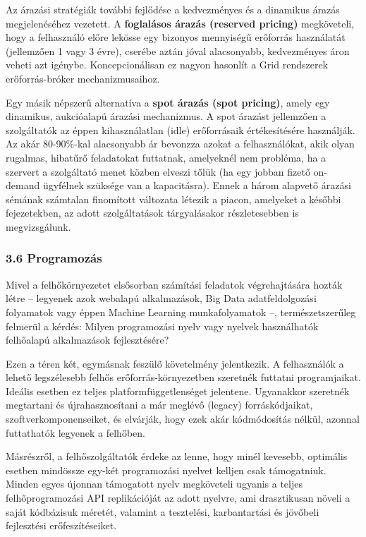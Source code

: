 \documentclass[
]{article}
\begin{document}
Az árazási stratégiák további fejlődése a kedvezményes és a dinamikus
árazás megjelenéséhez vezetett. A \textbf{foglalásos árazás (reserved
pricing)} megköveteli, hogy a felhasználó előre lekösse egy bizonyos
mennyiségű erőforrás használatát (jellemzően 1 vagy 3 évre), cserébe
aztán jóval alacsonyabb, kedvezményes áron veheti azt igénybe.
Koncepcionálisan ez nagyon hasonlít a Grid rendszerek erőforrás-bróker
mechanizmusaihoz.

Egy másik népszerű alternatíva a \textbf{spot árazás (spot pricing)},
amely egy dinamikus, aukcióalapú árazási mechanizmus. A spot árazást
jellemzően a szolgáltatók az éppen kihasználatlan (idle) erőforrásaik
értékesítésére használják. Az akár 80-90\%-kal alacsonyabb ár bevonzza
azokat a felhasználókat, akik olyan rugalmas, hibatűrő feladatokat
futtatnak, amelyeknél nem probléma, ha a szervert a szolgáltató menet
közben elveszi tőlük (ha egy jobban fizető on-demand ügyfélnek szüksége
van a kapacitásra). Ennek a három alapvető árazási sémának számtalan
finomított változata létezik a piacon, amelyeket a későbbi fejezetekben,
az adott szolgáltatások tárgyalásakor részletesebben is megvizsgálunk.

\hypertarget{programozuxe1s}{%
\subsubsection{3.6 Programozás}\label{programozuxe1s}}

Mivel a felhőkörnyezetet elsősorban számítási feladatok végrehajtására
hozták létre -- legyenek azok webalapú alkalmazások, Big Data
adatfeldolgozási folyamatok vagy éppen Machine Learning munkafolyamatok
--, természetszerűleg felmerül a kérdés: Milyen programozási nyelv vagy
nyelvek használhatók felhőalapú alkalmazások fejlesztésére?

Ezen a téren két, egymásnak feszülő követelmény jelentkezik. A
felhasználók a lehető legszélesebb felhős erőforrás-környezetben
szeretnék futtatni programjaikat. Ideális esetben ez teljes
platformfüggetlenséget jelentene. Ugyanakkor szeretnék megtartani és
újrahasznosítani a már meglévő (legacy) forráskódjaikat,
szoftverkomponenseiket, és elvárják, hogy ezek akár kódmódosítás nélkül,
azonnal futtathatók legyenek a felhőben.

Másrészről, a felhőszolgáltatók érdeke az lenne, hogy minél kevesebb,
optimális esetben mindössze egy-két programozási nyelvet kelljen csak
támogatniuk. Minden egyes újonnan támogatott nyelv megköveteli ugyanis a
teljes felhőprogramozási API replikációját az adott nyelvre, ami
drasztikusan növeli a saját kódbázisuk méretét, valamint a tesztelési,
karbantartási és jövőbeli fejlesztési erőfeszítéseiket.
\end{document}
